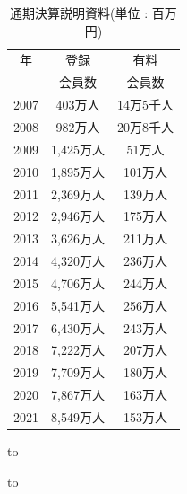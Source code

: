\documentclass[submit,techrep,noauthor]{ipsj}
\begin{document}
\begin{table}[h]
  \caption{通期決算説明資料(単位 : 百万円)} 
  \label{tab:ir_niconico}
  \begin{center}
  \begin{tabular}{c||c||c} \hline
  年 & 登録 & 有料 \\ 
   & 会員数 & 会員数 \\ \hline \hline
 2007 & 403万人 & \footnotesize{14万5千人} \\ \hline
 2008 & 982万人 & \footnotesize{20万8千人} \\ \hline
 2009 & 1,425万人 & 51万人 \\ \hline
 2010 & 1,895万人 & 101万人 \\ \hline
 2011 & 2,369万人 & 139万人 \\ \hline \hline
 2012 & 2,946万人 & 175万人 \\ \hline
 2013 & 3,626万人 & 211万人 \\ \hline
 2014 & 4,320万人 & 236万人 \\ \hline
 2015 & 4,706万人 & 244万人 \\ \hline
 2016 & 5,541万人 & 256万人 \\ \hline \hline
 2017 & 6,430万人 & 243万人 \\ \hline
 2018 & 7,222万人 & 207万人 \\ \hline
 2019 & 7,709万人 & 180万人 \\ \hline
 2020 & 7,867万人 & 163万人 \\ \hline
 2021 & 8,549万人 & 153万人 \\ \hline
  \end{tabular}
  \end{center}
\end{table}
%
\begin{table}[h] 
\caption{決算情報 - 直近4年セグメント別売上高} 
\label{tab:ir1}
\hbox to
\end{table}
%
\begin{table}[h] 
\caption{決算情報 - 売上および利益} 
\label{tab:ir2}
\hbox to
\end{table}
\end{document}
